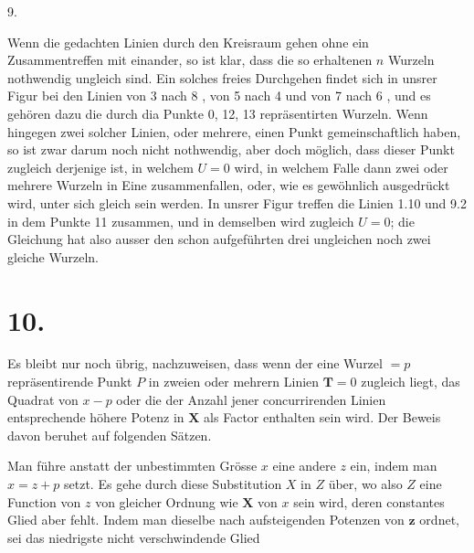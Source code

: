 \documentclass[twoside,12pt, showframe]{memoir}
\begin{document}
9.

Wenn die gedachten Linien durch den Kreisraum gehen ohne ein Zusammentreffen mit einander, so ist klar, dass die so erhaltenen \(n\) Wurzeln nothwendig ungleich sind. Ein solches freies Durchgehen findet sich in unsrer Figur bei den Linien von 3 nach 8 , von 5 nach 4 und von 7 nach 6 , und es gehören dazu die durch dia Punkte 0, 12, 13 repräsentirten Wurzeln. Wenn hingegen zwei solcher Linien, oder mehrere, einen Punkt gemeinschaftlich haben, so ist zwar darum noch nicht nothwendig, aber doch möglich, dass dieser Punkt zugleich derjenige ist, in welchem \(U=0\) wird, in welchem Falle dann zwei oder mehrere Wurzeln in Eine zusammenfallen, oder, wie es gewöhnlich ausgedrückt wird, unter sich gleich sein werden. In unsrer Figur treffen die Linien 1.10 und 9.2 in dem Punkte 11 zusammen, und in demselben wird zugleich \(U=0\); die Gleichung hat also ausser den schon aufgeführten drei ungleichen noch zwei gleiche Wurzeln.

\section*{10.}
Es bleibt nur noch übrig, nachzuweisen, dass wenn der eine Wurzel \(=p\)
repräsentirende Punkt \(P\) in zweien oder mehrern Linien \(\boldsymbol{T}=0\) zugleich liegt, das Quadrat von \(x-p\) oder die der Anzahl jener concurrirenden Linien entsprechende höhere Potenz in \(\boldsymbol{X}\) als Factor enthalten sein wird. Der Beweis davon beruhet auf folgenden Sätzen.

Man führe anstatt der unbestimmten Grösse \(x\) eine andere \(z\) ein, indem man \(x=z+p\) setzt. Es gehe durch diese Substitution \(X\) in \(Z\) über, wo also \(Z\) eine Function von \(z\) von gleicher Ordnung wie \(\mathbf{X}\) von \(x\) sein wird, deren constantes Glied aber fehlt. Indem man dieselbe nach aufsteigenden Potenzen von \(\boldsymbol{z}\) ordnet, sei das niedrigste nicht verschwindende Glied
\end{document}
